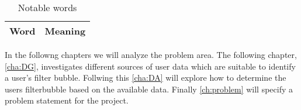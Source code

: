 \begin{table}[H]
\centering

\begin{tabular}{|l|p{6cm}|}
\hline
\textbf{Word} & \textbf{Meaning} \\ \hline

\end{tabular}
\caption{Notable words}
\end{table}



\nl In the followng chapters we will analyze the problem area. The following
chapter, \autoref{cha:DG}, investigates different sources of user data which are
suitable to identify a user's filter bubble.
Follwing this \autoref{cha:DA} will explore how to determine the users
filterbubble based on the available data. Finally \autoref{ch:problem} will
specify a problem statement for the project.
 
